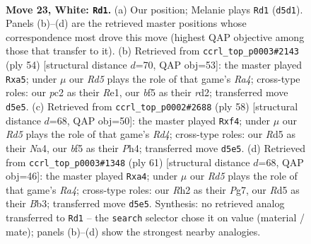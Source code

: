 \documentclass[11pt]{article}
\begin{document}
\clearpage

\begin{figure}[p]\centering
\begin{subfigure}{0.46\textwidth}\centering
\resizebox{\linewidth}{!}{%
\newchessgame
\chessboard[
  setfen={r1k3nN/3n4/1p6/p2Rpbpp/8/b4P1P/P1p3PR/4K3 w - - 0 23},
  showmover=false,
  pgfstyle=straightmove, color=movearrow, markmove={d5-d1}
]}
\caption{}
\end{subfigure}\hfill
\begin{subfigure}{0.46\textwidth}\centering
\resizebox{\linewidth}{!}{%
\newchessgame
\chessboard[
  setfen={r5k1/5pp1/2p2n1p/p1N5/RPB2b2/7P/3r1PP1/4R2K w - - 0 28},
  showmover=false,
  pgfstyle=straightmove, color=movearrow, markmove={a4-a5}
]}
\caption{}
\end{subfigure}
\\[4pt]
\begin{subfigure}{0.46\textwidth}\centering
\resizebox{\linewidth}{!}{%
\newchessgame
\chessboard[
  setfen={7r/1r2kp2/ppR1b2p/8/N2R1npP/8/PP3PP1/6K1 w - - 0 30},
  showmover=false,
  pgfstyle=straightmove, color=movearrow, markmove={d4-f4}
]}
\caption{}
\end{subfigure}\hfill
\begin{subfigure}{0.46\textwidth}\centering
\resizebox{\linewidth}{!}{%
\newchessgame
\chessboard[
  setfen={8/2pk2pp/5p2/r3p3/P3P3/1bP1BP1P/6P1/R5K1 b - - 0 31},
  showmover=false,
  pgfstyle=straightmove, color=movearrow, markmove={a5-a4}
]}
\caption{}
\end{subfigure}
\caption{\textbf{Move 23, White: \texttt{Rd1}.} (a) Our position; Melanie plays \texttt{Rd1} (\texttt{d5d1}). Panels (b)--(d) are the retrieved master positions whose correspondence most drove this move (highest QAP objective among those that transfer to it). (b) Retrieved from \texttt{ccrl\_top\_p0003\#2143} (ply 54) [structural distance $d$=70, QAP obj=53]: the master played \texttt{Rxa5}; under $\mu$ our \emph{Rd5} plays the role of that game's \emph{Ra4}; cross-type roles: our \emph{p}c2 as their \emph{R}e1, our \emph{b}f5 as their \emph{r}d2; transferred move \texttt{d5e5}. (c) Retrieved from \texttt{ccrl\_top\_p0002\#2688} (ply 58) [structural distance $d$=68, QAP obj=50]: the master played \texttt{Rxf4}; under $\mu$ our \emph{Rd5} plays the role of that game's \emph{Rd4}; cross-type roles: our \emph{R}d5 as their \emph{N}a4, our \emph{b}f5 as their \emph{P}h4; transferred move \texttt{d5e5}. (d) Retrieved from \texttt{ccrl\_top\_p0003\#1348} (ply 61) [structural distance $d$=68, QAP obj=46]: the master played \texttt{Rxa4}; under $\mu$ our \emph{Rd5} plays the role of that game's \emph{Ra4}; cross-type roles: our \emph{R}h2 as their \emph{P}g7, our \emph{R}d5 as their \emph{B}b3; transferred move \texttt{d5e5}. Synthesis: no retrieved analog transferred to \texttt{Rd1} -- the \texttt{search} selector chose it on value (material / mate); panels (b)--(d) show the strongest nearby analogies.}
\label{fig:thought-m44}
\end{figure}
\end{document}
